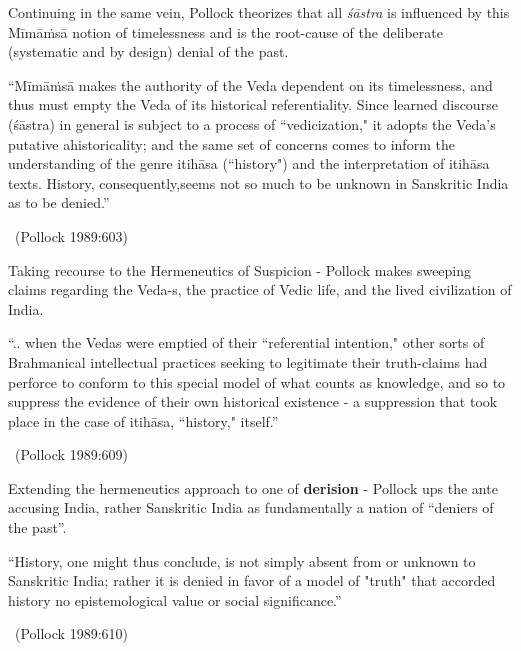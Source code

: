 Continuing in the same vein, Pollock theorizes that all \textit{śāstra} is influenced by this Mīmāṁsā notion of timelessness and is the root-cause of the deliberate (systematic and by design) denial of the past.

\vskip 3pt

\begin{myquote}
“Mīmāṁsā makes the authority of the Veda dependent on its timelessness, and thus must empty the Veda of its historical referentiality. Since learned discourse (śāstra) in general is subject to a process of “vedicization," it adopts the Veda's putative ahistoricality; and the same set of concerns comes to inform the understanding of the genre itihāsa (“history") and the interpretation of itihāsa texts. History, consequently,\break seems not so much to be unknown in Sanskritic India as to be denied.”

~\hfill (Pollock 1989:603)
\end{myquote}

Taking recourse to the Hermeneutics of Suspicion - Pollock makes sweeping claims regarding the Veda-s, the practice of Vedic life, and the lived civilization of India.

\begin{myquote}
“.. when the Vedas were emptied of their “referential intention," other sorts of Brahmanical intellectual practices seeking to legitimate their truth-claims had perforce to conform to this special model of what counts as knowledge, and so to suppress the evidence of their own historical existence - a suppression that took place in the case of itihāsa, “history," itself.”

~\hfill (Pollock 1989:609)
\end{myquote}

Extending the hermeneutics approach to one of \textbf{derision }- Pollock ups the ante accusing India, rather Sanskritic India as fundamentally a nation of “deniers of the past”.

\begin{myquote}
“History, one might thus conclude, is not simply absent from or unknown to Sanskritic India; rather it is denied in favor of a model of "truth" that accorded history no epistemological value or social significance.”

~\hfill (Pollock 1989:610)
\end{myquote}

